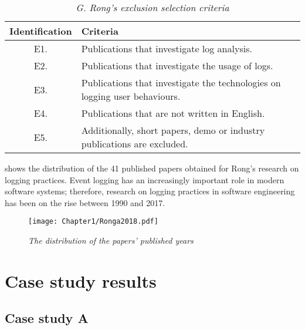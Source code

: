 \begin{table}[!htb]
	\centering
	\caption[G. Rong's exclusion selection criteria]
	{\textit{G. Rong's exclusion selection criteria \cite{Rong2018a}}}
	\label{tbl:CH1_RongExlSelectionCriteria}
	\begin{tabularx}{\textwidth}{|c|X|}
		\hline \textbf{Identification} & \textbf{Criteria} \\
		\hline E1. & Publications that investigate log analysis. \\
		\hline E2. & Publications that investigate the usage of logs. \\
		\hline E3. & Publications that investigate the technologies on logging user behaviours. \\
		\hline E4. & Publications that are not written in English. \\
		\hline E5. & Additionally, short papers, demo or industry publications are excluded. \\
		\hline
	\end{tabularx}
\end{table}

\clearpage

 shows the distribution of the 41 published papers obtained for Rong's research on logging practices. Event logging has an increasingly important role in modern software systems; therefore, research on logging practices in software engineering has been on the rise between 1990 and 2017.

\begin{figure}[!htb] %
	\centering %
	\texttt{[image: Chapter1/Ronga2018.pdf]}
	\caption[The distribution of the papers’ published years]
	{\textit{The distribution of the papers’ published years \cite{Rong2018a}}} \label{fig:PushblisedPapers}
\end{figure} 

\chapter{Case study results}\label{apx:caseStudies}
\section{Case study A}


